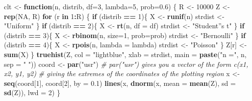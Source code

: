 \documentclass[]{article}
\newenvironment{Shaded}{\begin{snugshade}}{\end{snugshade}}
\newcommand{\KeywordTok}[1]{\textcolor[rgb]{0.13,0.29,0.53}{\textbf{#1}}}
\newcommand{\DataTypeTok}[1]{\textcolor[rgb]{0.13,0.29,0.53}{#1}}
\newcommand{\DecValTok}[1]{\textcolor[rgb]{0.00,0.00,0.81}{#1}}
\newcommand{\FloatTok}[1]{\textcolor[rgb]{0.00,0.00,0.81}{#1}}
\newcommand{\StringTok}[1]{\textcolor[rgb]{0.31,0.60,0.02}{#1}}
\newcommand{\CommentTok}[1]{\textcolor[rgb]{0.56,0.35,0.01}{\textit{#1}}}
\newcommand{\OtherTok}[1]{\textcolor[rgb]{0.56,0.35,0.01}{#1}}
\newcommand{\ControlFlowTok}[1]{\textcolor[rgb]{0.13,0.29,0.53}{\textbf{#1}}}
\newcommand{\OperatorTok}[1]{\textcolor[rgb]{0.81,0.36,0.00}{\textbf{#1}}}
\newcommand{\NormalTok}[1]{#1}
\begin{document}
\begin{Shaded}
\begin{Highlighting}[]
\NormalTok{clt <-}\StringTok{ }\ControlFlowTok{function}\NormalTok{(n, distrib, }\DataTypeTok{df=}\DecValTok{3}\NormalTok{, }\DataTypeTok{lambda=}\DecValTok{5}\NormalTok{, }\DataTypeTok{prob=}\FloatTok{0.6}\NormalTok{) \{}
\NormalTok{  R <-}\StringTok{ }\DecValTok{10000}
\NormalTok{  Z <-}\StringTok{ }\KeywordTok{rep}\NormalTok{(}\OtherTok{NA}\NormalTok{, R)}
  \ControlFlowTok{for}\NormalTok{ (r }\ControlFlowTok{in} \DecValTok{1}\OperatorTok{:}\NormalTok{R) \{}
      \ControlFlowTok{if}\NormalTok{ (distrib }\OperatorTok{==}\StringTok{ }\DecValTok{1}\NormalTok{)\{}
\NormalTok{        X <-}\StringTok{ }\KeywordTok{runif}\NormalTok{(n)}
\NormalTok{        strdist <-}\StringTok{ "Uniform"}
\NormalTok{        \}}
      \ControlFlowTok{if}\NormalTok{ (distrib }\OperatorTok{==}\StringTok{ }\DecValTok{2}\NormalTok{)\{}
\NormalTok{        X <-}\StringTok{ }\KeywordTok{rt}\NormalTok{(n, }\DataTypeTok{df =}\NormalTok{ df)}
\NormalTok{        strdist <-}\StringTok{ "Student''s t"}
\NormalTok{        \}}
      \ControlFlowTok{if}\NormalTok{ (distrib }\OperatorTok{==}\StringTok{ }\DecValTok{3}\NormalTok{)\{}
\NormalTok{        X <-}\StringTok{ }\KeywordTok{rbinom}\NormalTok{(n, }\DataTypeTok{size=}\DecValTok{1}\NormalTok{, }\DataTypeTok{prob=}\NormalTok{prob)}
\NormalTok{        strdist <-}\StringTok{ "Bernoulli"}
\NormalTok{        \}}
      \ControlFlowTok{if}\NormalTok{ (distrib }\OperatorTok{==}\StringTok{ }\DecValTok{4}\NormalTok{)\{}
\NormalTok{        X <-}\StringTok{ }\KeywordTok{rpois}\NormalTok{(n, }\DataTypeTok{lambda =}\NormalTok{ lambda)}
\NormalTok{        strdist <-}\StringTok{ "Poisson"}
\NormalTok{        \}}
\NormalTok{      Z[r] <-}\StringTok{ }\KeywordTok{sum}\NormalTok{(X)}
\NormalTok{  \}}
  \KeywordTok{truehist}\NormalTok{(Z, }\DataTypeTok{col =} \StringTok{"lightblue"}\NormalTok{, }\DataTypeTok{xlab =}\NormalTok{ strdist, }\DataTypeTok{main =} \KeywordTok{paste}\NormalTok{(}\StringTok{"n ="}\NormalTok{, n, }\DataTypeTok{sep =} \StringTok{" "}\NormalTok{))}
\NormalTok{  coord <-}\StringTok{ }\KeywordTok{par}\NormalTok{(}\StringTok{"usr"}\NormalTok{)}
  \CommentTok{# par("usr") gives you a vector of the form c(x1, x2, y1, y2)}
  \CommentTok{# giving the extremes of the coordinates of the plotting region}
\NormalTok{  x <-}\StringTok{ }\KeywordTok{seq}\NormalTok{(coord[}\DecValTok{1}\NormalTok{], coord[}\DecValTok{2}\NormalTok{], }\DataTypeTok{by =} \FloatTok{0.1}\NormalTok{)}
  \KeywordTok{lines}\NormalTok{(x, }\KeywordTok{dnorm}\NormalTok{(x, }\DataTypeTok{mean =} \KeywordTok{mean}\NormalTok{(Z), }\DataTypeTok{sd =} \KeywordTok{sd}\NormalTok{(Z)), }\DataTypeTok{lwd =} \DecValTok{2}\NormalTok{)}
\NormalTok{\}}
\end{Highlighting}
\end{Shaded}
\end{document}
